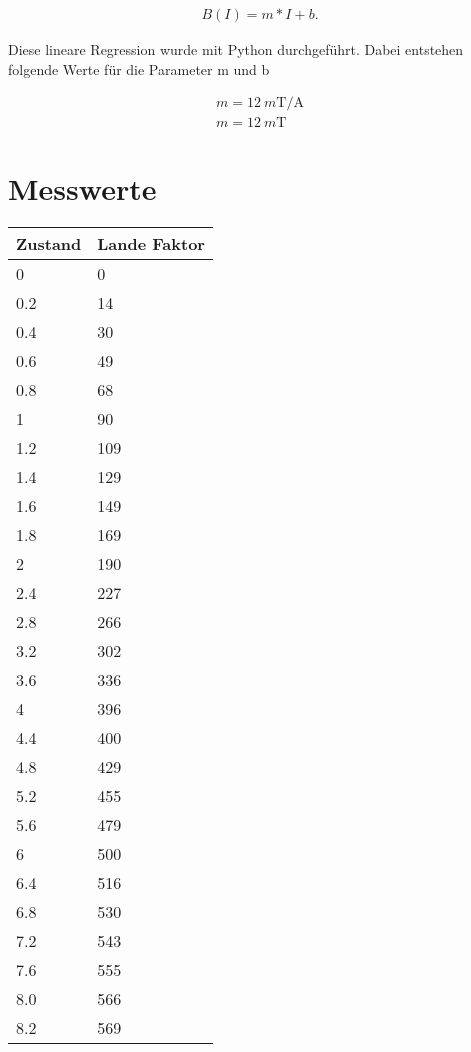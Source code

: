 \begin{align}
    B(I) = m * I + b.
\end{align}

Diese lineare Regression wurde mit Python durchgeführt. Dabei entstehen folgende Werte für die Parameter m und b

\begin{align}
    m = \SI[separate-uncertainty=true]{12}{m\tesla \per \ampere} \\
    m = \SI[separate-uncertainty=true]{12}{m\tesla}
\end{align}


\section{Messwerte}

\begin{minipage}{\linewidth}
    \begin{table}[H]
        \centering
    \begin{tabular}{ll}
        \toprule
        Zustand & Lande Faktor \\
        \midrule
        0   & 0 \\
        0.2 & 14 \\
        0.4 & 30 \\
        0.6 & 49 \\
        0.8 & 68 \\
        1   & 90 \\
        1.2 & 109 \\
        1.4 & 129 \\
        1.6 & 149 \\
        1.8 & 169 \\
        2   & 190 \\
        2.4 & 227 \\
        2.8 & 266 \\
        3.2 & 302 \\
        3.6 & 336 \\
        4   & 396 \\
        4.4 & 400 \\
        4.8 & 429 \\
        5.2 & 455 \\
        5.6 & 479 \\
        6   & 500 \\
        6.4 & 516 \\
        6.8 & 530 \\
        7.2 & 543 \\
        7.6 & 555 \\
        8.0 & 566 \\
        8.2 & 569 \\
        \bottomrule   
    \end{tabular}
    
    \label{tab:2}
\end{table}
\end{minipage}
